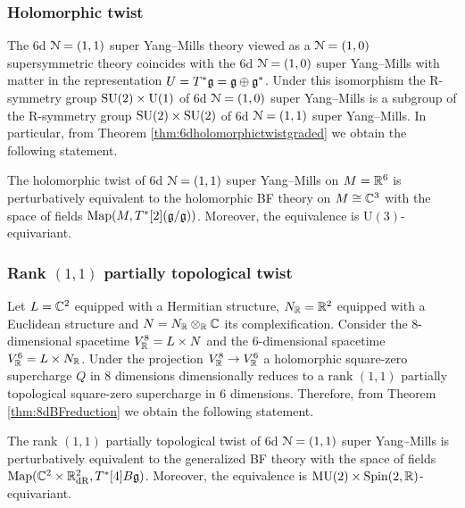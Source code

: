 \documentclass[10pt, oneside]{article}
\newcommand{\MU}{\mathrm{MU}}
\renewcommand{\U}{\mathrm{U}}
\begin{document}
\subsubsection{Holomorphic twist}
\label{sect:6d11holomorphictwist}

The 6d $\mathcal N=(1, 1)$ super Yang--Mills theory viewed as a $\mathcal N=(1, 0)$ supersymmetric theory coincides with the 6d $\mathcal N=(1, 0)$ super Yang--Mills with matter in the representation $U=T^*\mathfrak g=\mathfrak g\oplus \mathfrak g^*$. Under this isomorphism the R-symmetry group $\SU(2)\times \U(1)$ of 6d $\mathcal N=(1, 0)$ super Yang--Mills is a subgroup of the R-symmetry group $\mathrm{SU}(2)\times \mathrm{SU}(2)$ of 6d $\mathcal N=(1, 1)$ super Yang--Mills. In particular, from Theorem \ref{thm:6dholomorphictwistgraded} we obtain the following statement.

\begin{theorem}
The holomorphic twist of 6d $\mathcal N=(1, 1)$ super Yang--Mills on $M=\mathbb R^6$ is perturbatively equivalent to the holomorphic BF theory on $M\cong \mathbb C^3$ with the space of fields $\operatorname{Map}(M, T^*[2] (\mathfrak g/\mathfrak g))$. Moreover, the equivalence is $\U(3)$-equivariant.
\label{thm:6d11holomorphictwist}
\end{theorem}

\subsubsection{Rank \texorpdfstring{$(1, 1)$}{(1,1)} partially topological twist}
\label{sect:6d11partialtwist}

Let $L=\mathbb C^2$ equipped with a Hermitian structure, $N_\mathbb R=\mathbb R^2$ equipped with a Euclidean structure and $N=N_\mathbb R\otimes_\mathbb R\mathbb C$ its complexification. Consider the 8-dimensional spacetime $V^8_\mathbb R=L\times N$ and the 6-dimensional spacetime $V^6_\mathbb R=L\times N_\mathbb R$. Under the projection $V^8_\mathbb R\rightarrow V^6_\mathbb R$ a holomorphic square-zero supercharge $Q$ in 8 dimensions dimensionally reduces to a rank $(1, 1)$ partially topological square-zero supercharge in 6 dimensions. Therefore, from Theorem \ref{thm:8dBFreduction} we obtain the following statement.

\begin{theorem}
The rank $(1, 1)$ partially topological twist of 6d $\mathcal N=(1, 1)$ super Yang--Mills is perturbatively equivalent to the generalized BF theory with the space of fields $\operatorname{Map}(\mathbb C^2\times \mathbb R^2_{\mathrm{dR}}, T^*[4] B\mathfrak g)$. Moreover, the equivalence is $\MU(2)\times\Spin(2, \RR)$-equivariant.
\end{theorem}
\end{document}
